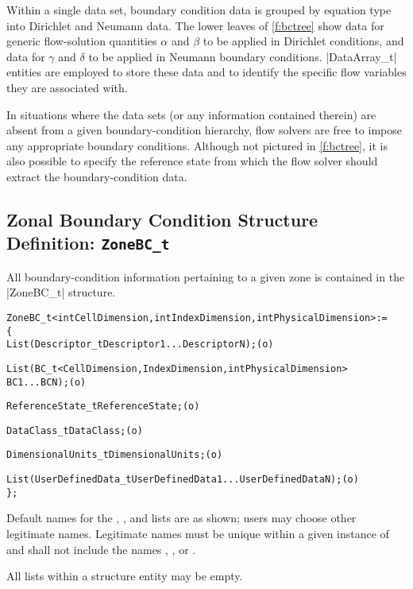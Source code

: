 Within a single data set, boundary condition data is grouped by
equation type into Dirichlet and Neumann data.  The lower leaves of
\autoref{f:bctree} show data for generic flow-solution quantities
$\alpha$ and $\beta$ to be applied in Dirichlet conditions, and data
for $\gamma$ and $\delta$ to be applied in Neumann boundary conditions.
|DataArray_t| entities are employed to store these data and to identify
the specific flow variables they are associated with.

In situations where the data sets (or any information contained therein)
are absent from a given boundary-condition hierarchy, flow solvers
are free to impose any appropriate boundary conditions.  Although
not pictured in \autoref{f:bctree}, it is also possible to specify
the reference state from which the flow solver should extract the
boundary-condition data.

\subsection{Zonal Boundary Condition Structure Definition: \texttt{ZoneBC\_t}}
\label{s:ZoneBC}

All boundary-condition information pertaining to a given
zone is contained in the |ZoneBC_t| structure.
\begin{alltt}
  ZoneBC\_t< int CellDimension, int IndexDimension, int PhysicalDimension > :=
    \{
    List( Descriptor\_t Descriptor1 ... DescriptorN ) ;                      (o)

    List( BC\_t<CellDimension, IndexDimension, int PhysicalDimension> 
          BC1 ... BCN ) ;                                                   (o)

    ReferenceState\_t ReferenceState ;                                       (o)

    DataClass\_t DataClass ;                                                 (o)
                
    DimensionalUnits\_t DimensionalUnits ;                                   (o)

    List( UserDefinedData\_t UserDefinedData1 ... UserDefinedDataN ) ;       (o)
    \} ;
\end{alltt}

\begin{notes}
\item
 Default names for the , , and
 lists are as shown; users may choose other legitimate names.
 Legitimate names must be unique within a given instance of
  and shall not include the names ,
 , or .
\item
 All lists within a  structure entity may be empty.
\end{notes}

